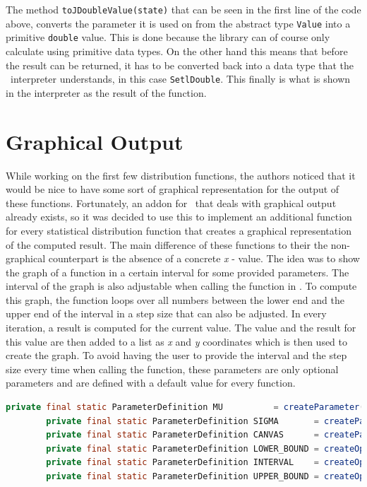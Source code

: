 The method \lstinline{toJDoubleValue(state)} that can be seen in the first line of the code above, converts the parameter it is used on from the abstract type \lstinline{Value} into a primitive \lstinline{double} value. This is done because the library can of course only calculate using primitive data types. On the other hand this means that before the result can be returned, it has to be converted back into a data type that the \setlx\ interpreter understands, in this case \lstinline{SetlDouble}. This finally is what is shown in the interpreter as the result of the function.

\section{Graphical Output}

While working on the first few distribution functions, the authors noticed that it would be nice to have some sort of graphical representation for the output of these functions. Fortunately, an addon for \setlx\ that deals with graphical output already exists, so it was decided to use this to implement an additional function for every statistical distribution function that creates a graphical representation of the computed result. The main difference of these functions to their the non-graphical counterpart is the absence of a concrete \textit{x} - value. The idea was to show the graph of a function in a certain interval for some provided parameters. The interval of the graph is also adjustable when calling the function in \setlx. To compute this graph, the function loops over all numbers between the lower end and the upper end of the interval in a step size that can also be adjusted. In every iteration, a result is computed for the current value. The value and the result for this value are then added to a list as \textit{x} and \textit{y} coordinates which is then used to create the graph. To avoid having the user to provide the interval and the step size every time when calling the function, these parameters are only optional parameters and are defined with a default value for every function.

\begin{center}
	\begin{lstlisting}[caption={Optional Parameters for Bounds and Interval}, language={java}, label=lis:boundsInterval]
		private final static ParameterDefinition MU          = createParameter("mu");
		private final static ParameterDefinition SIGMA       = createParameter("sigma");
		private final static ParameterDefinition CANVAS      = createParameter("canvas");
		private final static ParameterDefinition LOWER_BOUND = createOptionalParameter("lowerBound", Defaults.createSetlDoubleValue(-5.0));
		private final static ParameterDefinition INTERVAL    = createOptionalParameter("interval", Defaults.getDefaultPlotInterval());
		private final static ParameterDefinition UPPER_BOUND = createOptionalParameter("upperBound", Defaults.createSetlDoubleValue(5.0));
	\end{lstlisting}
\end{center}

